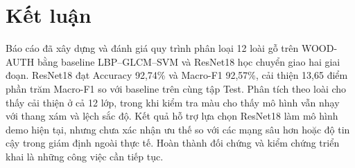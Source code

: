 \documentclass[conference]{IEEEtran}
\begin{document}
\section{Kết luận}
\nopagebreak[4]
Báo cáo đã xây dựng và đánh giá quy trình phân loại 12 loài gỗ trên WOOD-AUTH bằng baseline LBP--GLCM--SVM và ResNet18 học chuyển giao hai giai đoạn. ResNet18 đạt Accuracy 92,74\% và Macro-F1 92,57\%, cải thiện 13,65 điểm phần trăm Macro-F1 so với baseline trên cùng tập Test. Phân tích theo loài cho thấy cải thiện ở cả 12 lớp, trong khi kiểm tra màu cho thấy mô hình vẫn nhạy với thang xám và lệch sắc độ. Kết quả hỗ trợ lựa chọn ResNet18 làm mô hình demo hiện tại, nhưng chưa xác nhận ưu thế so với các mạng sâu hơn hoặc độ tin cậy trong giám định ngoài thực tế. Hoàn thành đối chứng và kiểm chứng triển khai là những công việc cần tiếp tục.



\end{document}
